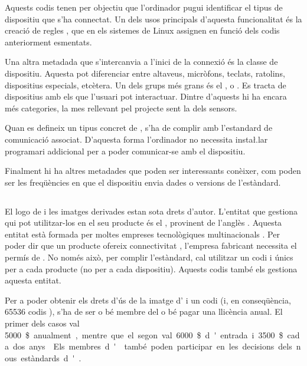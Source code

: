 Aquests codis tenen per objectiu que l'ordinador pugui identificar el tipus de
dispositiu que s'ha connectat. Un dels usos principals d'aquesta funcionalitat
és la creació de regles , que en els sistemes de Linux assignen
 en funció dels codis anteriorment esmentats.

Una altra metadada que s'intercanvia a l'inici de la connexió és la classe
de dispositiu. Aquesta pot diferenciar entre altaveus, micròfons, teclats,
ratolins, dispositius especials, etcètera. Un dels grups més grans és el
, o . Es tracta de dispositius amb els
que l'usuari pot interactuar. Dintre d'aquests hi ha encara més categories,
la mes rellevant pel projecte sent la dels sensors.

Quan es defineix un tipus concret de , s'ha de complir amb
l'estandard de comunicació associat. D'aquesta forma l'ordinador no necessita
insta\l.lar programari addicional per a poder comunicar-se amb el dispositiu.

Finalment hi ha altres metadades que poden ser interessants conèixer, com
poden ser les freqüències en que el dispositiu envia dades o versions de
l'estàndard.

\subsection{}
\label{subsec:usb-if}

El logo de  i les imatges derivades estan sota drets d'autor. L'entitat
que gestiona qui pot utilitzar-los en el seu producte és el ,
provinent de l'anglès . Aquesta entitat està
formada per moltes empreses tecnològiques multinacionals \cite{USBGetting}.
Per poder dir que un producte ofereix connectivitat , l'empresa
fabricant necessita el permís de . No només això, per complir
l'estàndard, cal utilitzar un codi  i  únics per a cada
producte (no per a cada dispositiu). Aquests codis també els gestiona aquesta
entitat.

Per a poder obtenir els drets d'ús de la imatge d' i un codi
 (i, en conseqüència, 65536 codis ), s'ha de ser o bé
membre del  o bé pagar una llicència anual. El
primer dels casos val \SI{5000}\$ anualment, mentre que el segon
val \SI{6000}\$ d'entrada i \SI{3500}\$ cada dos anys
\cite{USBGetting}. Els membres d' també poden participar en les
decisions dels nous estàndards d'.

